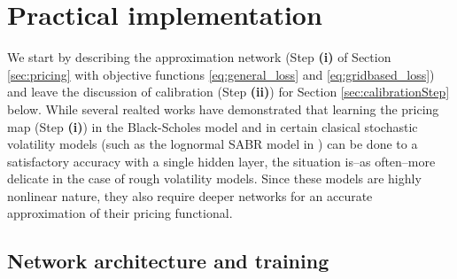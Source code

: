 \documentclass{article}
\theoremstyle{remark}
\begin{document}
\section{Practical implementation}
\label{sec:implementation}
We start by describing the approximation network (Step \textbf{(i)} of Section \ref{sec:pricing}  with objective functions \eqref{eq:general_loss} and \eqref{eq:gridbased_loss}) and leave the discussion of calibration (Step \textbf{(ii)}) for Section \ref{sec:calibrationStep} below.
While several realted works \cite{Hutchison94, CulcinDas17, McGhee} have demonstrated that learning the pricing map (Step \textbf{(i)}) in the Black-Scholes model and in certain clasical stochastic volatility models (such as the lognormal SABR model in \cite{McGhee}) can be done to a satisfactory accuracy with a single hidden layer, the situation is--as often--more delicate in the case of rough volatility models. Since these models are highly nonlinear nature, they also require deeper networks for an accurate approximation of their pricing functional.

\subsection{Network architecture and training}

\label{sec:architecture}


\end{document}
